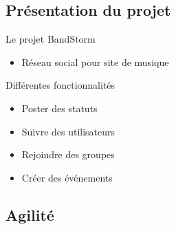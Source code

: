 \DylanSpeak
\subsection{Présentation du projet}
\begin{frame}{Le projet BandStorm}
	\begin{itemize}
		\item Réseau social pour site de musique
	\end{itemize}
	\vfill
	\begin{block}{Différentes fonctionnalités}
		\begin{itemize}
			\item Poster des statuts
			\item Suivre des utilisateurs
			\item Rejoindre des groupes
			\item Créer des événements
		\end{itemize}
	\end{block}
\end{frame}

\JulianSpeak
\subsection{Agilité}
\begin{frame}
\end{frame}
